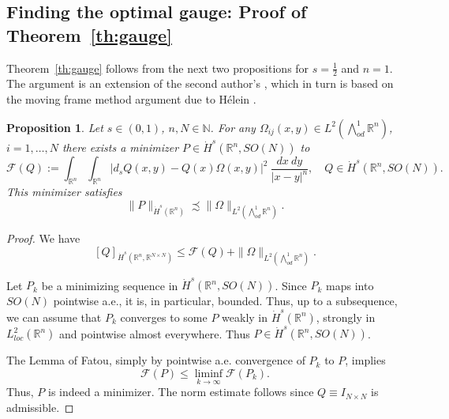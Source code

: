 \documentclass[12pt]{amsart}
\def\N{{\mathbb N}}
\newtheorem{proposition}[theorem]{Proposition}
\theoremstyle{definition}
\newcommand{\R}{\mathbb{R}}
\newcommand{\Ep}{\bigwedge\nolimits}
\numberwithin{theorem}{section} \numberwithin{equation}{section}
\newcommand{\aleq}{\precsim}
\begin{document}
\subsection{Finding the optimal gauge: Proof of Theorem~\ref{th:gauge}}\label{s:gaugeconstruction}
Theorem~\ref{th:gauge} follows from the next two propositions for $s = \frac{1}{2}$ and $n=1$. The argument is an extension of the second author's \cite{Schikorra-2010}, which in turn is based on the moving frame method argument due to H\'elein \cite{Helein91}.
% 
\begin{proposition}
Let $s \in (0,1)$, $n,N \in \N$. For any $\Omega_{ij}(x,y) \in L^2(\Ep^1_{od}\R^n)$, $i =1,\ldots,N$ there exists a minimizer $P \in \dot{H}^{s}(\R^n,SO(N))$ to
\[
\mathcal{F}(Q) := \int_{\R^n}\int_{\R^n} \left |d_sQ(x,y) - Q(x) \Omega(x,y) \right |^2\ \frac{dx\ dy}{|x-y|^n} , \quad Q \in \dot{H}^{s}(\R^n,SO(N)).
\]
This minimizer satisfies
\[
 \|P\|_{\dot{H}^{s}(\R^n)} \aleq \|\Omega\|_{L^2(\Ep^1_{od}\R^n)}.
\]
\end{proposition}
\begin{proof}
We have
\[
 [Q]_{\dot{H}^s(\R^n,\R^{N \times N})} \leq \mathcal{F}(Q) + \|\Omega\|_{L^2(\Ep^1_{od}\R^n)}.
\]

Let $P_k$ be a minimizing sequence in $\dot{H}^{s}(\R^n,SO(N))$. Since $P_k$ maps into $SO(N)$ pointwise a.e., it is, in particular, bounded. Thus, up to a subsequence, we can assume that $P_k$ converges to some $P$ weakly in $\dot{H}^{s}(\R^n)$, strongly in $L^2_{loc}(\R^n)$ and pointwise almost everywhere. Thus $P \in \dot{H}^s(\R^n,SO(N))$. 

The Lemma of Fatou, simply by pointwise a.e. convergence of $P_k$ to $P$, implies
\[
 \mathcal{F}(P) \leq \liminf_{k \to \infty} \mathcal{F}(P_k).
\]
Thus, $P$ is indeed a minimizer. The norm estimate follows since $Q \equiv I_{N \times N}$ is admissible.
\end{proof}
\end{document}

